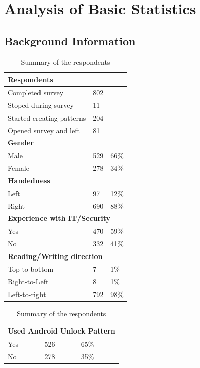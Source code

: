 \section{Analysis of Basic Statistics} \label{sec:basicstatistics}

	\subsection{Background Information} \label{sec:summaryogbasicstats}

		\begin{table}[H]
      \parbox{.45\linewidth}{
        \centering
        \begin{tabular}{ l | l l }
          \hline
          \multicolumn{3}{l}{\bf Respondents} \\ \hline
          Completed survey & 802 \\
          Stoped during survey & 11 \\
          Started creating patterns & 204 \\
          Opened survey and left & 81 \\ \hline
            
          \multicolumn{3}{l}{\bf Gender} \\ \hline
          Male & 529 & 66\% \\
          Female & 278 & 34\% \\ \hline

          \multicolumn{3}{l}{\bf Handedness} \\ \hline
          Left & 97 & 12\% \\
          Right & 690 & 88\% \\ \hline

          \multicolumn{3}{l}{\bf Experience with IT/Security} \\ \hline
          Yes & 470 & 59\% \\
          No & 332 & 41\% \\ \hline

          \multicolumn{2}{l}{\bf Reading/Writing direction} \\ \hline
          Top-to-bottom & 7 & 1\% \\
          Right-to-Left & 8 & 1\% \\
          Left-to-right & 792 & 98\% \\ \hline
        \end{tabular}
        \caption{Summary of the respondents}
        \label{tab:respondentsBasics}
      }
      \hfill
      \parbox{.45\linewidth}{
        \centering
        \vspace{1.7cm}
        \begin{tabular}{ l | l l }
          \hline
          \multicolumn{3}{l}{\bf Used Android Unlock Pattern} \\ \hline
          Yes & 526 & 65\% \\ 
          No & 278 & 35\% \\ \hline


\end{tabular}}
\end{table}
